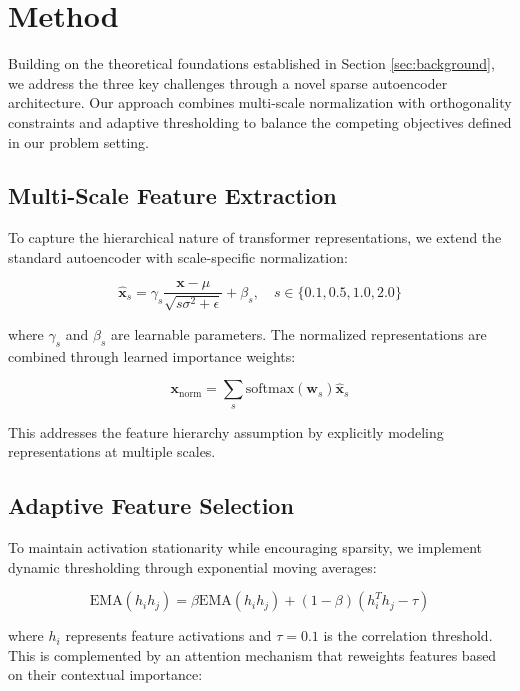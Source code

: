 \documentclass{article} %
\begin{document}
\section{Method}
\label{sec:method}

Building on the theoretical foundations established in Section \ref{sec:background}, we address the three key challenges through a novel sparse autoencoder architecture. Our approach combines multi-scale normalization with orthogonality constraints and adaptive thresholding to balance the competing objectives defined in our problem setting.

\subsection{Multi-Scale Feature Extraction}
To capture the hierarchical nature of transformer representations, we extend the standard autoencoder with scale-specific normalization:

\begin{equation}
    \hat{\mathbf{x}}_s = \gamma_s \frac{\mathbf{x} - \mu}{\sqrt{s\sigma^2 + \epsilon}} + \beta_s, \quad s \in \{0.1, 0.5, 1.0, 2.0\}
\end{equation}

where $\gamma_s$ and $\beta_s$ are learnable parameters. The normalized representations are combined through learned importance weights:

\begin{equation}
    \mathbf{x}_{\text{norm}} = \sum_{s} \text{softmax}(\mathbf{w}_s)\hat{\mathbf{x}}_s
\end{equation}

This addresses the feature hierarchy assumption by explicitly modeling representations at multiple scales.

\subsection{Adaptive Feature Selection}
To maintain activation stationarity while encouraging sparsity, we implement dynamic thresholding through exponential moving averages:

\begin{equation}
    \text{EMA}(h_ih_j) = \beta\text{EMA}(h_ih_j) + (1-\beta)(h_i^Th_j - \tau)
\end{equation}

where $h_i$ represents feature activations and $\tau=0.1$ is the correlation threshold. This is complemented by an attention mechanism that reweights features based on their contextual importance:
\end{document}
